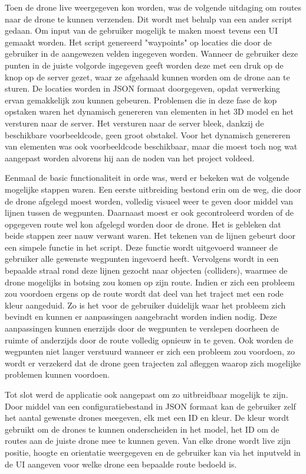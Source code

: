 Toen de drone live weergegeven kon worden, was de volgende uitdaging om routes naar de drone te kunnen verzenden. Dit wordt met behulp van een ander script gedaan. Om input van de gebruiker mogelijk te maken moest tevens een UI gemaakt worden. Het script genereerd "waypoints" op locaties die door de gebruiker in de aangewezen velden ingegeven worden. Wanneer de gebruiker deze punten in de juiste volgorde ingegeven geeft worden deze met een druk op de knop op de server gezet, waar ze afgehaald kunnen worden om de drone aan te sturen. De locaties worden in JSON formaat doorgegeven, opdat verwerking ervan gemakkelijk zou kunnen gebeuren. Problemen die in deze fase de kop opstaken waren het dynamisch genereren van elementen in het 3D model en het versturen naar de server. Het versturen naar de server bleek, dankzij de beschikbare voorbeeldcode, geen groot obstakel. Voor het dynamisch genereren van elementen was ook voorbeeldcode beschikbaar, maar die moest toch nog wat aangepast worden alvorens hij aan de noden van het project voldeed.

Eenmaal de basic functionaliteit in orde was, werd er bekeken wat de volgende mogelijke stappen waren. Een eerste uitbreiding bestond erin om de weg, die door de drone afgelegd moest worden, volledig visueel weer te geven door middel van lijnen tussen de wegpunten. Daarnaast moest er ook gecontroleerd worden of de opgegeven route wel kon afgelegd worden door de drone. Het is gebleken dat beide stappen zeer nauw verwant waren. Het tekenen van de lijnen gebeurt door een simpele functie in het script. Deze functie wordt uitgevoerd wanneer de gebruiker alle gewenste wegpunten ingevoerd heeft. Vervolgens wordt in een bepaalde straal rond deze lijnen gezocht naar objecten (colliders), waarmee de drone mogelijks in botsing zou komen op zijn route. Indien er zich een probleem zou voordoen ergens op de route wordt dat deel van het traject met een rode kleur aangeduid. Zo is het voor de gebruiker duidelijk waar het probleem zich bevindt en kunnen er aanpassingen aangebracht worden indien nodig. Deze aanpassingen kunnen enerzijds door de wegpunten te verslepen doorheen de ruimte of anderzijds door de route volledig opnieuw in te geven. Ook worden de wegpunten niet langer verstuurd wanneer er zich een probleem zou voordoen, zo wordt er verzekerd dat de drone geen trajecten zal afleggen waarop zich mogelijke problemen kunnen voordoen.

Tot slot werd de applicatie ook aangepast om zo uitbreidbaar mogelijk te zijn. Door middel van een configuratiebestand in JSON formaat kan de gebruiker zelf het aantal gewenste drones meegeven, elk met een ID en kleur. De kleur wordt gebruikt om de drones te kunnen onderscheiden in het model, het ID om de routes aan de juiste drone mee te kunnen geven. Van elke drone wordt live zijn positie, hoogte en orientatie weergegeven en de gebruiker kan via het inputveld in de UI aangeven voor welke drone een bepaalde route bedoeld is.